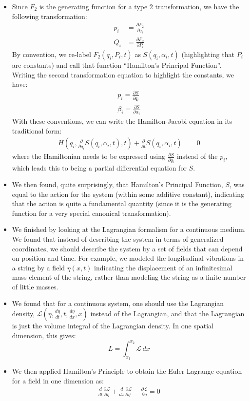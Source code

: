 \documentclass[10pt]{report}
\newcommand{\die}[2]{\frac{\partial #1}{\partial #2}}
\newcommand{\lagd}{\mathcal{L}}
\begin{document}
\begin{itemize}
\begin{align*}
\dot P_i&=0 \rightarrow \alpha_i\equiv P_i
\end{align*}
\item Since $F_2$ is the generating function for a type 2 transformation, we have the following transformation:
\begin{align*}
p_i&=\die{F_2}{q_i}\nonumber\\
Q_i&=\die{F_2}{P_i}\nonumber
\end{align*}
By convention, we re-label $F_2(q_i, P_i, t)$ as $S(q_i, \alpha_i,t)$ (highlighting that $P_i$ are constants) and call that function ``Hamilton's Principal Function''. Writing the second transformation equation to highlight the constants, we have:
\begin{align*}
p_i=\die{S}{q_i}\\
\beta_i=\die{S}{\alpha_i}
\end{align*}
With these conventions, we can write the Hamilton-Jacobi equation in its traditional form:
\begin{align*}
H(q_i,\die{}{q_i}S(q_i,\alpha_i,t),t)+\die{}{t}S(q_i,\alpha_i,t)&=0
\end{align*}
where the Hamiltonian needs to be expressed using $\die{S}{q_i}$ instead of the $p_i$, which leads this to being a partial differential equation for $S$.
\item We then found, quite surprisingly, that Hamilton's Principal Function, $S$, was equal to the action for the system (within some additive constant), indicating that the action is quite a fundamental quantity (since it is the generating function for a very special canonical transformation).
\item We finished by looking at the Lagrangian formalism for a continuous medium. We found that instead of describing the system in terms of generalized coordinates, we should describe the system by a set of fields that can depend on position and time. For example, we modeled the longitudinal vibrations in a string by a field $\eta(x,t)$ indicating the displacement of an infinitesimal mass element of the string, rather than modeling the string as a finite number of little masses.
\item We found that for a continuous system, one should use the Lagrangian density, $\mathcal{L}(\eta,\frac{d\eta}{dt},t,\frac{d\eta}{dx},x)$ instead of the Lagrangian, and that the Lagrangian is just the volume integral of the Lagrangian density. In one spatial dimension, this gives:
\begin{equation}
L= \int_{x_1}^{x_2}\mathcal{L}\,dx
\end{equation}
\item We then applied Hamilton's Principle to obtain the Euler-Lagrange equation for a field in one dimension as:
\begin{align*}
\frac{d}{dt}\die{\lagd}{\dot\eta}+\frac{d}{dx}\die{\lagd}{\eta'}-\die{\lagd}{\eta}=0
\end{align*}
\end{itemize}
\end{document}
